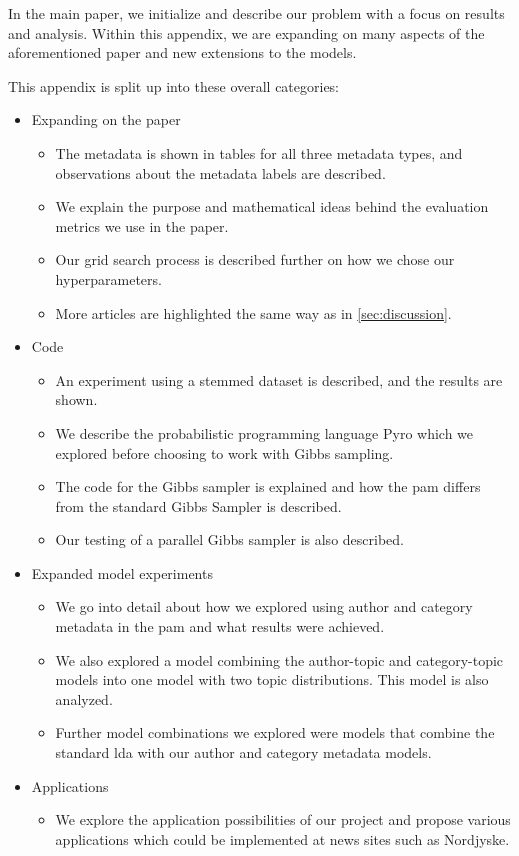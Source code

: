 In the main paper, we initialize and describe our problem with a focus on results and analysis. 
Within this appendix, we are expanding on many aspects of the aforementioned paper and new extensions to the models.

This appendix is split up into these overall categories:
\begin{itemize}
	\item Expanding on the paper
	\begin{itemize}
		\item The metadata is shown in tables for all three metadata types, and observations about the metadata labels are described.
		\item We explain the purpose and mathematical ideas behind the evaluation metrics we use in the paper.
		\item Our grid search process is described further on how we chose our hyperparameters.
		\item More articles are highlighted the same way as in \autoref{sec:discussion}.
	\end{itemize}
	\item Code
	\begin{itemize}
		\item An experiment using a stemmed dataset is described, and the results are shown.
		\item We describe the probabilistic programming language Pyro which we explored before choosing to work with Gibbs sampling.
		\item The code for the Gibbs sampler is explained and how the \gls{pam} differs from the standard Gibbs Sampler is described. 
		\item Our testing of a parallel Gibbs sampler is also described.
	\end{itemize}
	\item Expanded model experiments
	\begin{itemize}
		\item We go into detail about how we explored using author and category metadata in the \gls{pam} and what results were achieved.
		\item We also explored a model combining the author-topic and category-topic models into one model with two topic distributions. This model is also analyzed.
		\item Further model combinations we explored were models that combine the standard \gls{lda} with our author and category metadata models.
	\end{itemize}
	\item Applications
	\begin{itemize}
		\item We explore the application possibilities of our project and propose various applications which could be implemented at news sites such as Nordjyske.
	\end{itemize}
\end{itemize}
